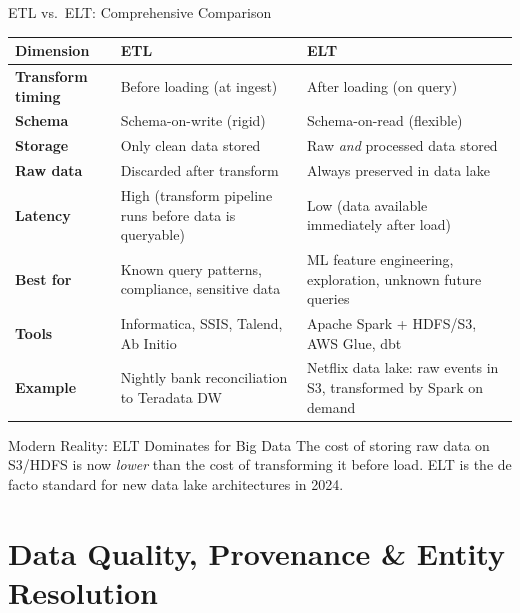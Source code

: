 \documentclass[aspectratio=169,10pt]{beamer}
\begin{document}
\begin{frame}{ETL vs.\ ELT: Comprehensive Comparison}
  \centering
  \renewcommand{\arraystretch}{1.45}
  \begin{tabular}{p{2.8cm}p{4.3cm}p{4.3cm}}
    \toprule
    \textbf{Dimension} & \textbf{ETL} & \textbf{ELT} \\
    \midrule
    \textbf{Transform timing} & Before loading (at ingest) & After loading (on query) \\
    \textbf{Schema} & Schema-on-write (rigid) & Schema-on-read (flexible) \\
    \textbf{Storage} & Only clean data stored & Raw \emph{and} processed data stored \\
    \textbf{Raw data} & Discarded after transform & Always preserved in data lake \\
    \textbf{Latency} & High (transform pipeline runs before data is queryable) & Low (data available immediately after load) \\
    \textbf{Best for} & Known query patterns, compliance, sensitive data & ML feature engineering, exploration, unknown future queries \\
    \textbf{Tools} & Informatica, SSIS, Talend, Ab Initio & Apache Spark + HDFS/S3, AWS Glue, dbt \\
    \textbf{Example} & Nightly bank reconciliation to Teradata DW & Netflix data lake: raw events in S3, transformed by Spark on demand \\
    \bottomrule
  \end{tabular}
  \vspace{6pt}
  \begin{alertblock}{Modern Reality: ELT Dominates for Big Data}
    The cost of storing raw data on S3/HDFS is now \emph{lower} than the cost of transforming it before load.  ELT is the de facto standard for new data lake architectures in 2024.
  \end{alertblock}
\end{frame}

\section{Data Quality, Provenance \& Entity Resolution}
\end{document}
